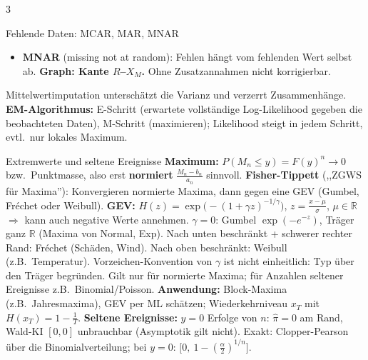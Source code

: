 \documentclass[8pt,a4paper,landscape]{extarticle}
\newcommand{\ra}{$\Rightarrow$}
\begin{document}
\begin{multicols*}{3}
\begin{wissen}{Fehlende Daten: MCAR, MAR, MNAR}
\begin{itemize}
\item \textbf{MNAR} (missing not at random): Fehlen hängt vom fehlenden Wert selbst ab. \textbf{Graph: Kante $R$--$X_M$.} Ohne Zusatzannahmen nicht korrigierbar.
\end{itemize}
Mittelwertimputation unterschätzt die Varianz und verzerrt Zusammenhänge. \textbf{EM-Algorithmus:} E-Schritt (erwartete vollständige Log-Likelihood gegeben die beobachteten Daten), M-Schritt (maximieren); Likelihood steigt in jedem Schritt, evtl.\ nur lokales Maximum.
\end{wissen}
\begin{wissen}{Extremwerte und seltene Ereignisse}
\textbf{Maximum:} $P(M_n\le y)=F(y)^n\to 0$ bzw.\ Punktmasse, also erst \textbf{normiert} $\frac{M_n-b_n}{a_n}$ sinnvoll. \textbf{Fisher-Tippett} (,,ZGWS für Maxima''): Konvergieren normierte Maxima, dann gegen eine GEV (Gumbel, Fréchet oder Weibull).
\textbf{GEV:} $H(z)=\exp\big(-(1+\gamma z)^{-1/\gamma}\big)$, $z=\frac{x-\mu}{\sigma}$, $\mu\in\mathbb R$ \ra{} kann auch negative Werte annehmen. $\gamma=0$: Gumbel $\exp(-e^{-z})$, Träger ganz $\mathbb R$ (Maxima von Normal, Exp). Nach unten beschränkt + schwerer rechter Rand: Fréchet (Schäden, Wind). Nach oben beschränkt: Weibull (z.B.\ Temperatur). Vorzeichen-Konvention von $\gamma$ ist nicht einheitlich: Typ über den Träger begründen.
Gilt nur für normierte Maxima; für Anzahlen seltener Ereignisse z.B.\ Binomial/Poisson. \textbf{Anwendung:} Block-Maxima (z.B.\ Jahresmaxima), GEV per ML schätzen; Wiederkehrniveau $x_T$ mit $H(x_T)=1-\frac1T$.
\textbf{Seltene Ereignisse:} $y=0$ Erfolge von $n$: $\hat\pi=0$ am Rand, Wald-KI $[0,0]$ unbrauchbar (Asymptotik gilt nicht). Exakt: Clopper-Pearson über die Binomialverteilung; bei $y=0$: $\big[0,\ 1-(\frac\alpha2)^{1/n}\big]$.
\end{wissen}


\end{multicols*}
\end{document}
